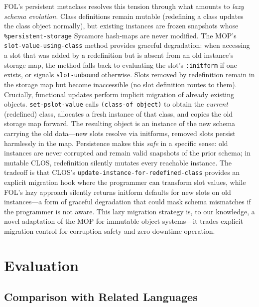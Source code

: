 \documentclass[sigconf,nonacm,review]{acmart}
\begin{document}
FOL's persistent metaclass resolves this tension through what amounts to \textit{lazy schema evolution}. Class definitions remain mutable (redefining a class updates the class object normally), but existing instances
are frozen snapshots whose \texttt{\%persistent-storage} Sycamore hash-maps are never modified. The MOP's \texttt{slot-value-using-class} method provides graceful degradation: when accessing a slot that was added by a redefinition
but is absent from an old instance's storage map, the method falls back to evaluating the slot's \texttt{:initform} if one exists, or signals \texttt{slot-unbound} otherwise. Slots removed by redefinition remain in the
storage map but become inaccessible (no slot definition routes to them). Crucially, functional updates perform implicit migration of already existing objects. \texttt{set-pslot-value} calls \texttt{(class-of object)} to
obtain the \textit{current} (redefined) class, allocates a fresh instance of that class, and copies the old storage map forward. The resulting object is an instance of the new schema carrying the old data---new slots
resolve via initforms, removed slots persist harmlessly in the map. Persistence makes this \textit{safe} in a specific sense: old instances are never corrupted and remain valid snapshots of the prior schema; in mutable CLOS,
redefinition silently mutates every reachable instance. The tradeoff is that CLOS's \texttt{update-instance-for-redefined-class} provides an explicit migration hook where the programmer can transform slot values, while FOL's
lazy approach silently returns initform defaults for new slots on old instances---a form of graceful degradation that could mask schema mismatches if the programmer is not aware. This lazy migration strategy is, to our knowledge,
a novel adaptation of the MOP for immutable object systems---it trades explicit migration control for corruption safety and zero-downtime operation.

\section{Evaluation}

\subsection{Comparison with Related Languages}
\end{document}
